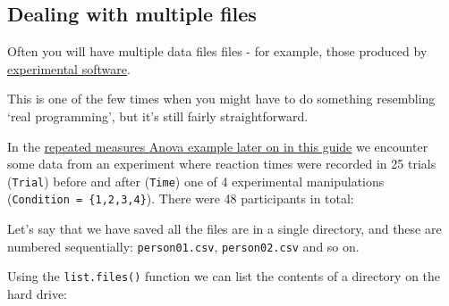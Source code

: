 \documentclass[]{article}
\begin{document}
\hypertarget{multiple-raw-data-files}{%
\subsection*{Dealing with multiple files}\label{multiple-raw-data-files}}

Often you will have multiple data files files - for example, those produced by
\href{http://www.psychopy.org}{experimental software}.

This is one of the few times when you might have to do something resembling
`real programming', but it's still fairly straightforward.

In the \protect\hyperlink{trad-rm-anova}{repeated measures Anova example later on in this guide}
we encounter some data from an experiment where reaction times were recorded in
25 trials (\texttt{Trial}) before and after (\texttt{Time}) one of 4 experimental
manipulations (\texttt{Condition\ =\ \{1,2,3,4\}}). There were 48 participants in total:

Let's say that we have saved all the files are in a single directory, and these
are numbered sequentially: \texttt{person01.csv}, \texttt{person02.csv} and so on.

Using the \texttt{list.files()} function we can list the contents of a directory on the
hard drive:
\end{document}

